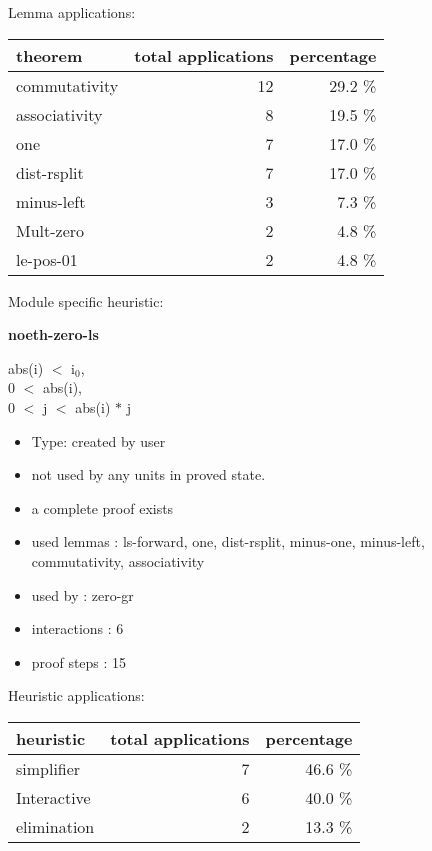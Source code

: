 \documentclass[a4paper]{article}
\begin{document}
Lemma applications:

\begin{supertabular}{l|r|r}
theorem	        & total applications & percentage \\ \hline
commutativity & 12 & 29.2 \% \\
associativity & 8 & 19.5 \% \\
one & 7 & 17.0 \% \\
dist-rsplit & 7 & 17.0 \% \\
minus-left & 3 & 7.3 \% \\
Mult-zero & 2 & 4.8 \% \\
le-pos-01 & 2 & 4.8 \% \\

\end{supertabular}

Module specific heuristic:

\pagebreak

{\LARGE\bf noeth-zero-ls}\label{lemma-noeth-zero-ls}

\medskip

abs(i) $<$ $\mbox{i}_{0}$, \\
0 $<$ abs(i), \\
0 $<$ j  $<$ abs(i) $*$ j

\begin{itemize}

\item Type: created by user

\item not used by any units in proved state.
\item       a complete proof exists
\item       used lemmas  : ls-forward, one, dist-rsplit, minus-one, minus-left, commutativity, associativity
\item       used by      : zero-gr
\item       interactions : 6
\item       proof steps  : 15
\end{itemize}

\medskip


Heuristic applications:

\begin{supertabular}{l|r|r}
heuristic	& total applications & percentage \\ \hline
simplifier & 7 & 46.6 \% \\
Interactive & 6 & 40.0 \% \\
elimination & 2 & 13.3 \% \\

\end{supertabular}
\end{document}
